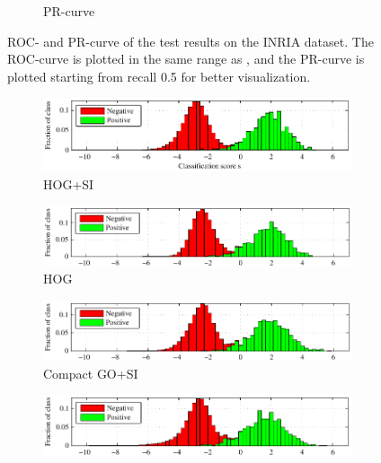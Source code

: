 \documentclass[thesis.tex]{subfiles}
\begin{document}
\begin{figure}[tb]
{\begin{subfigure}[t]{0.593\textwidth}
		\caption{PR-curve}
		\label{fig:inriaTestResultsPR}
	\end{subfigure}}
	\caption{ROC- and PR-curve of the test results on the INRIA dataset. The ROC-curve is plotted in the same range as \citet{dalal2005histograms}, and the PR-curve is plotted starting from recall 0.5 for better visualization.}
	\label{fig:inriaTestResults}
\end{figure}
%
\begin{figure}
	\centering
	\begin{subfigure}[t]{\textwidth}
		\includegraphics[width=\textwidth]{img/inriaHistogramHogSiFinal.pdf}
		\caption{HOG+SI}
		\label{fig:inriaHistogramHogSiFinal}
	\end{subfigure}
	\begin{subfigure}[t]{\textwidth}
		\includegraphics[width=\textwidth]{img/inriaHistogramHogFinal.pdf}
		\caption{HOG}
		\label{fig:inriaHistogramHogFinal}
	\end{subfigure}
	\begin{subfigure}[t]{\textwidth}
		\includegraphics[width=\textwidth]{img/inriaHistogramCompact3Final.pdf}
		\caption{Compact GO+SI}
		\label{fig:inriaHistogramCompact3Final}
	\end{subfigure}
	\begin{subfigure}[t]{\textwidth}
		\includegraphics[width=\textwidth]{img/inriaHistogramGoSiFinal.pdf}

\end{subfigure}
\end{figure}
\end{document}
